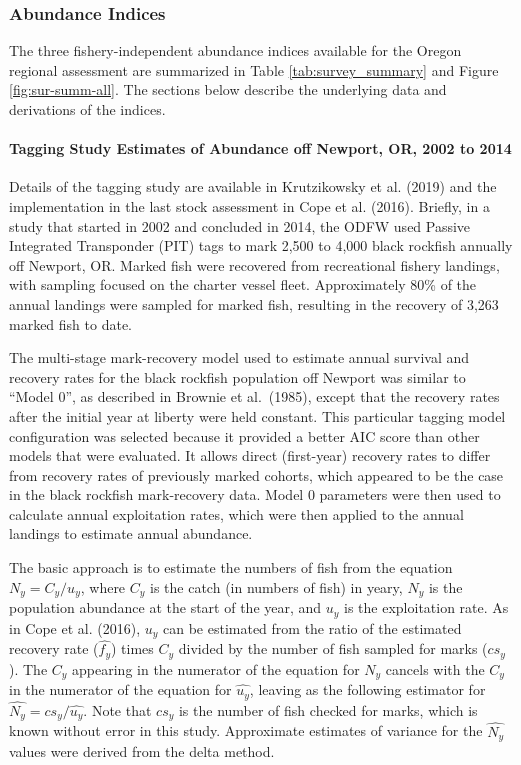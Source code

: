 \documentclass[11pt,
  letterpaper,
]{article}
\begin{document}
\hypertarget{abundance-indices}{%
\subsubsection{Abundance Indices}\label{abundance-indices}}

The three fishery-independent abundance indices available for the Oregon regional assessment are summarized in Table \ref{tab:survey_summary} and Figure \ref{fig:sur-summ-all}. The sections below describe the underlying data and derivations of the indices.

\hypertarget{tagging-study-estimates-of-abundance-off-newport-or-2002-to-2014}{%
\paragraph{Tagging Study Estimates of Abundance off Newport, OR, 2002 to 2014}\label{tagging-study-estimates-of-abundance-off-newport-or-2002-to-2014}}

Details of the tagging study are available in Krutzikowsky et al. (2019) and the implementation in the last stock assessment in Cope et al. (2016). Briefly, in a study that started in 2002 and concluded in 2014, the ODFW used Passive Integrated Transponder (PIT) tags to mark 2,500 to 4,000 black rockfish annually off Newport, OR. Marked fish were recovered from recreational fishery landings, with sampling focused on the charter vessel fleet. Approximately 80\% of the annual landings were sampled for marked fish, resulting in the recovery of 3,263 marked fish to date.

The multi-stage mark-recovery model used to estimate annual survival and recovery rates for the black rockfish population off Newport was similar to ``Model 0'', as described in Brownie et al.~(1985), except that the recovery rates after the initial year at liberty were held constant. This particular tagging model configuration was selected because it provided a better AIC score than other models that were evaluated. It allows direct (first-year) recovery rates to differ from recovery rates of previously marked cohorts, which appeared to be the case in the black rockfish mark-recovery data. Model 0 parameters were then used to calculate annual exploitation rates, which were then applied to the annual landings to estimate annual abundance.

The basic approach is to estimate the numbers of fish from the equation \(N_y= C_y/u_y\), where \(C_y\) is the catch (in numbers of fish) in yeary, \(N_y\) is the population abundance at the start of the year, and \(u_y\) is the exploitation rate. As in Cope et al. (2016), \(u_y\) can be estimated from the ratio of the estimated recovery rate (\(\hat{f_y}\)) times \(C_y\) divided by the number of fish sampled for marks (\(cs_y\)). The \(C_y\) appearing in the numerator of the equation for \(N_y\) cancels with the \(C_y\) in the numerator of the equation for \(\hat{u_y}\), leaving as the following estimator for \(\hat{N_y}=cs_y/\hat{u_y}\). Note that \(cs_y\) is the number of fish checked for marks, which is known without error in this study. Approximate estimates of variance for the \(\hat{N_y}\) values were derived from the delta method.
\end{document}
